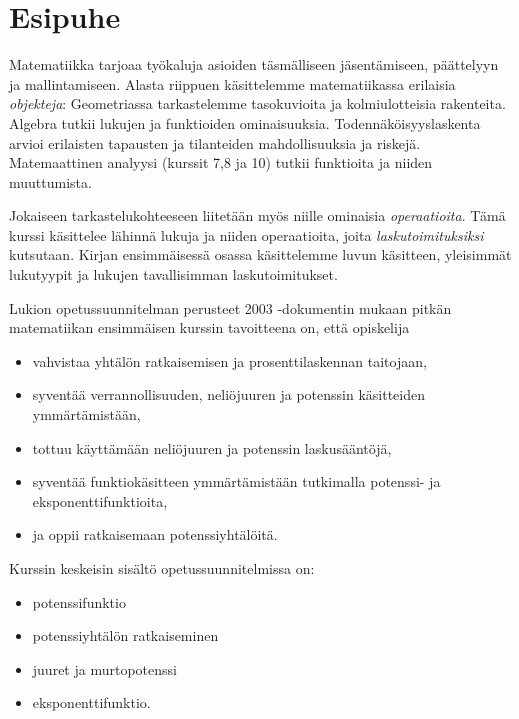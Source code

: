 
\chapter{Esipuhe}



Matematiikka tarjoaa työkaluja asioiden täsmälliseen jäsentämiseen, päättelyyn ja mallintamiseen. Alasta riippuen käsittelemme matematiikassa erilaisia \emph{objekteja}: Geometriassa tarkastelemme tasokuvioita ja kolmiulotteisia rakenteita. Algebra tutkii lukujen ja funktioiden ominaisuuksia. Todennäköisyyslaskenta arvioi erilaisten tapausten ja tilanteiden mahdollisuuksia ja riskejä. Matemaattinen analyysi (kurssit 7,8 ja 10) tutkii funktioita ja niiden muuttumista.

Jokaiseen tarkastelukohteeseen liitetään myös niille ominaisia \emph{operaatioita}. Tämä kurssi käsittelee lähinnä lukuja ja niiden operaatioita, joita \emph{laskutoimituksiksi} kutsutaan. Kirjan ensimmäisessä osassa käsittelemme luvun käsitteen, yleisimmät lukutyypit ja lukujen tavallisimman laskutoimitukset.

Lukion opetussuunnitelman perusteet 2003 -dokumentin mukaan pitkän matematiikan ensimmäisen kurssin tavoitteena on, että opiskelija 
\begin{itemize}
\item vahvistaa yhtälön ratkaisemisen ja prosenttilaskennan taitojaan,
\item syventää verrannollisuuden, neliöjuuren ja potenssin käsitteiden ymmärtämistään,
\item tottuu käyttämään neliöjuuren ja potenssin laskusääntöjä,
\item syventää funktiokäsitteen ymmärtämistään tutkimalla potenssi- ja eksponenttifunktioita,
\item ja oppii ratkaisemaan potenssiyhtälöitä.
\end{itemize}
Kurssin keskeisin sisältö opetussuunnitelmissa on:
\begin{itemize}
\item potenssifunktio
\item potenssiyhtälön ratkaiseminen
\item juuret ja murtopotenssi
\item eksponenttifunktio.
\end{itemize}

